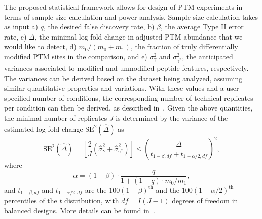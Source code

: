 \documentclass{mcp}
\begin{document}
The proposed statistical framework allows for design of PTM experiments in terms of sample size calculation and power analysis. 
Sample size calculation takes as input a) $q$, the desired false discovery rate, b) $\beta$, the average Type II error rate, c) $\Delta$, the minimal log-fold change in adjusted PTM abundance that we would like to detect, d) $m_0 / (m_0 + m_1)$, the fraction of truly differentially modified PTM sites in the comparison, and e) $\sigma_{\gamma}^{2}$ and $\sigma_{\gamma^{\ast}}^{2}$, the anticipated variances associated to modified and unmodified peptide features, respectively. The variances can be derived based on the dataset being analyzed, assuming similar quantitative properties and variations. With these values and a user-specified number of conditions, the corresponding number of technical replicates per condition can then be derived, as described in~\cite{kutner_etal_04a}. Given the above quantities, the minimal number of replicates $J$ is determined by the variance of the estimated log-fold change $\mathrm{SE}^{2}(\hat{\Delta})$ as
\[
\mathrm{SE}^{2}(\hat{\Delta}) = \left[ \frac{2}{J} \left( \hat{\sigma}_{\gamma}^{2} + \hat{\sigma}_{\gamma^{\ast}}^{2} \right) \right]
\leq \left( \frac{\Delta}{t_{1-\beta, df} + t_{1-\alpha /2, df}} \right)^{2},
\]
where 
\[
\alpha = (1 - \beta) \cdot \frac{q}{1 + (1-q) \cdot m_0 / m_1},
\]
and $t_{1-\beta, df}$ and $t_{1-\alpha /2, df}$ are the $100(1-\beta)^{\text{th}}$ and the $100(1-\alpha /2)^{\text{th}}$ percentiles of the $t$ distribution, with $df = I(J-1)$ degrees of freedom in balanced designs. More details can be found in~\cite{oberg_vitek_09a}. 
\end{document}
